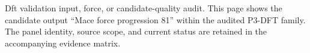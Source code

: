 Dft validation input, force, or candidate-quality audit. This page shows the candidate output ``Mace force progression 81'' within the audited P3-DFT family. The panel identity, source scope, and current status are retained in the accompanying evidence matrix.
